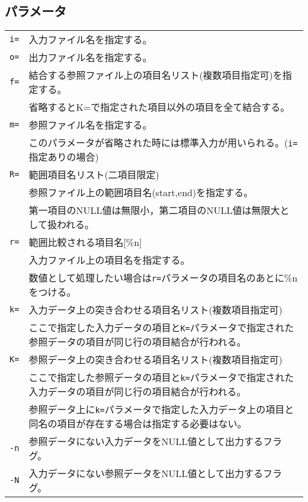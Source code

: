 \subsection*{パラメータ}
\begin{table}[htbp]
{\small
\begin{tabular}{ll}
\verb|i=|    & 入力ファイル名を指定する。\\
\verb|o=|    & 出力ファイル名を指定する。\\
\verb|f=|    & 結合する参照ファイル上の項目名リスト(複数項目指定可)を指定する。\\
             & 省略するとK=で指定された項目以外の項目を全て結合する。\\
\verb|m=|    & 参照ファイル名を指定する。\\
             & このパラメータが省略された時には標準入力が用いられる。(\verb|i=|指定ありの場合)\\
\verb|R=|    & 範囲項目名リスト(二項目限定)\\
             & 参照ファイル上の範囲項目名(start,end)を指定する。\\
             & 第一項目のNULL値は無限小，第二項目のNULL値は無限大として扱われる。\\
\verb|r=|    & 範囲比較される項目名[\%{n}]\\
             & 入力ファイル上の項目名を指定する。\\
             & 数値として処理したい場合は\verb|r=|パラメータの項目名のあとに\%nをつける。\\
\verb|k=|    & 入力データ上の突き合わせる項目名リスト(複数項目指定可)\\
             & ここで指定した入力データの項目と\verb|K=|パラメータで指定された参照データの項目が同じ行の項目結合が行われる。\\
\verb|K=|    & 参照データ上の突き合わせる項目名リスト(複数項目指定可)\\
             & ここで指定した参照データの項目と\verb|k=|パラメータで指定された入力データの項目が同じ行の項目結合が行われる。\\
             & 参照データ上に\verb|k=|パラメータで指定した入力データ上の項目と同名の項目が存在する場合は指定する必要はない。\\
\verb|-n|    & 参照データにない入力データをNULL値として出力するフラグ。\\
\verb|-N|    & 入力データにない参照データをNULL値として出力するフラグ。\\
\end{tabular} 
}
\end{table} 


